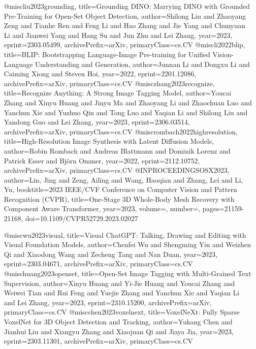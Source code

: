@misc{liu2023grounding,
title={Grounding {DINO}: Marrying {DINO} with Grounded Pre-Training for Open-Set Object Detection},
author={Shilong Liu and Zhaoyang Zeng and Tianhe Ren and Feng Li and Hao Zhang and Jie Yang and Chunyuan Li and Jianwei Yang and Hang Su and Jun Zhu and Lei Zhang},
year={2023},
eprint={2303.05499},
archivePrefix={arXiv},
primaryClass={cs.CV}
}
@misc{li2022blip,
title={BLIP: Bootstrapping Language-Image Pre-training for Unified Vision-Language Understanding and Generation},
author={Junnan Li and Dongxu Li and Caiming Xiong and Steven Hoi},
year={2022},
eprint={2201.12086},
archivePrefix={arXiv},
primaryClass={cs.CV}
}
@misc{zhang2023recognize,
title={Recognize Anything: A Strong Image Tagging Model},
author={Youcai Zhang and Xinyu Huang and Jinyu Ma and Zhaoyang Li and Zhaochuan Luo and Yanchun Xie and Yuzhuo Qin and Tong Luo and Yaqian Li and Shilong Liu and Yandong Guo and Lei Zhang},
year={2023},
eprint={2306.03514},
archivePrefix={arXiv},
primaryClass={cs.CV}
}
@misc{rombach2022highresolution,
title={High-Resolution Image Synthesis with Latent Diffusion Models},
author={Robin Rombach and Andreas Blattmann and Dominik Lorenz and Patrick Esser and Björn Ommer},
year={2022},
eprint={2112.10752},
archivePrefix={arXiv},
primaryClass={cs.CV}
}
@INPROCEEDINGS{OSX2023,
author={Lin, Jing and Zeng, Ailing and Wang, Haoqian and Zhang, Lei and Li, Yu},
booktitle={2023 IEEE/CVF Conference on Computer Vision and Pattern Recognition (CVPR)},
title={One-Stage 3D Whole-Body Mesh Recovery with Component Aware Transformer},
year={2023},
volume={},
number={},
pages={21159-21168},
doi={10.1109/CVPR52729.2023.02027}}

@misc{wu2023visual,
title={Visual {C}hat{GPT}: Talking, Drawing and Editing with Visual Foundation Models},
author={Chenfei Wu and Shengming Yin and Weizhen Qi and Xiaodong Wang and Zecheng Tang and Nan Duan},
year={2023},
eprint={2303.04671},
archivePrefix={arXiv},
primaryClass={cs.CV}
}
@misc{huang2023openset,
title={Open-Set Image Tagging with Multi-Grained Text Supervision},
author={Xinyu Huang and Yi-Jie Huang and Youcai Zhang and Weiwei Tian and Rui Feng and Yuejie Zhang and Yanchun Xie and Yaqian Li and Lei Zhang},
year={2023},
eprint={2310.15200},
archivePrefix={arXiv},
primaryClass={cs.CV}
}
@misc{chen2023voxelnext,
title={VoxelNeXt: Fully Sparse VoxelNet for 3D Object Detection and Tracking},
author={Yukang Chen and Jianhui Liu and Xiangyu Zhang and Xiaojuan Qi and Jiaya Jia},
year={2023},
eprint={2303.11301},
archivePrefix={arXiv},
primaryClass={cs.CV}
}